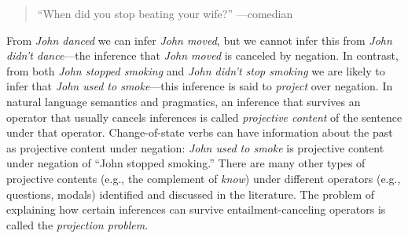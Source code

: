 

\begin{quotation}
``When did you stop beating your wife?'' ---comedian
\end{quotation}

From \emph{John danced} we can infer \emph{John moved}, but we cannot infer this from \emph{John didn't dance}---the inference that \emph{John moved} is canceled by negation.
In contrast, from both \emph{John stopped smoking} and \emph{John didn't stop smoking} we are likely to infer that \emph{John used to smoke}---this inference is said to \emph{project} over negation.
In natural language semantics and pragmatics, an inference that survives an operator that usually cancels inferences is called
 \emph{projective content} of the sentence under that operator. 
Change-of-state verbs can have information about the past as projective content under negation: \emph{John used to smoke} is projective content under negation of ``John stopped smoking.'' 
There are many other types of projective contents 
 (e.g., the complement of \emph{know}) under different operators 
 (e.g., questions, modals) identified and discussed in the literature. 
The problem of explaining how certain inferences can
 survive entailment-canceling operators is called the \emph{projection problem}.




